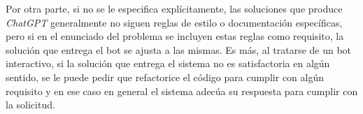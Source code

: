 \documentclass[twocolumn,twoside,a4paper, 10pt]{article}
\newcommand{\ChatGPT}{\textit{ChatGPT}{}}           %
\begin{document}
Por otra parte, si no se le especifica explícitamente, las soluciones que produce \ChatGPT{} generalmente no
siguen reglas de estilo o documentación específicas, pero si en el enunciado del problema se incluyen
estas reglas como requisito, la solución que entrega el bot se ajusta a las mismas.
Es más, al tratarse de un bot interactivo, si la solución que entrega el sistema no es satisfactoria en algún
sentido, se le puede pedir que refactorice el código para cumplir con algún requisito y en ese caso en general
el sistema adecúa su respuesta para cumplir con la solicitud.

\end{document}
